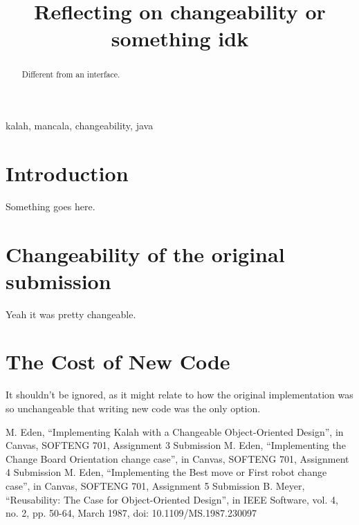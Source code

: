 \documentclass[10pt, a4paper, conference]{IEEEtran}
\begin{document}
\title{Reflecting on changeability or something idk}

\author{
}

\maketitle

\begin{abstract}
  Different from an interface.
\end{abstract}

\begin{IEEEkeywords}
kalah, mancala, changeability, java
\end{IEEEkeywords}

\section{Introduction}
Something goes here.

\section{Changeability of the original submission}
Yeah it was pretty changeable.

\section{The Cost of New Code}
It shouldn't be ignored, as it might relate to how the original implementation
was so unchangeable that writing new code was the only option.

\begin{thebibliography}{00}
   M. Eden, ``Implementing Kalah with a Changeable
    Object-Oriented Design'', in Canvas, SOFTENG 701, Assignment 3 
    Submission
   M. Eden, ``Implementing the Change Board Orientation
    change case'', in Canvas, SOFTENG 701, Assignment 4 Submission
   M. Eden, ``Implementing the Best move or First robot
    change case'', in Canvas, SOFTENG 701, Assignment 5 Submission
   B. Meyer, ``Reusability: The Case for Object-Oriented
    Design'', in IEEE Software, vol. 4, no. 2, pp. 50-64, March 1987, 
    doi: 10.1109/MS.1987.230097
\end{thebibliography}
\end{document}
